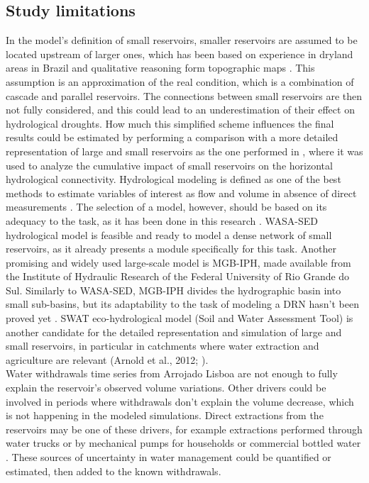 \documentclass[draft]{agujournal2019}
\begin{document}
\subsection{Study limitations}\label{sec:studylim}
In the model’s definition of small reservoirs, smaller reservoirs are assumed to be located upstream of larger ones, which has been based on experience in dryland areas in Brazil and qualitative reasoning form topographic maps \cite{Mamede2018,Guntner2004}. This assumption is an approximation of the real condition, which is a combination of cascade and parallel reservoirs. The connections between small reservoirs are then not fully considered, and this could lead to an underestimation of their effect on hydrological droughts. How much this simplified scheme influences the final results could be estimated by performing a comparison with a more detailed representation of large and small reservoirs as the one performed in , where it was used to analyze the cumulative impact of small reservoirs on the horizontal hydrological connectivity. Hydrological modeling is defined as one of the best methods to estimate variables of interest as flow and volume in absence of direct measurements \cite{Marahatta2021}. The selection of a model, however, should be based on its adequacy to the task, as it has been done in this research \cite{Addor2019}. WASA-SED hydrological model is feasible and ready to model a dense network of small reservoirs, as it already presents a module specifically for this task. Another promising and widely used large-scale model is MGB-IPH, made available from the Institute of Hydraulic Research of the Federal University of Rio Grande do Sul. Similarly to WASA-SED, MGB-IPH divides the hydrographic basin into small sub-basins, but its adaptability to the task of modeling a DRN hasn’t been proved yet \cite{Collischonn2007,DePaiva2013}. SWAT eco-hydrological model (Soil and Water Assessment Tool) is another candidate for the detailed representation and simulation of large and small reservoirs, in particular in catchments where water extraction and agriculture are relevant (Arnold et al., 2012; \cite{Rabelo2021}).\\
Water withdrawals time series from Arrojado Lisboa are not enough to fully explain the reservoir’s observed volume variations. Other drivers could be involved in periods where withdrawals don’t explain the volume decrease, which is not happening in the modeled simulations. Direct extractions from the reservoirs may be one of these drivers, for example extractions performed through water trucks or by mechanical pumps for households or commercial bottled water \cite{DeLiraAzevedo2017}. These sources of uncertainty in water management could be quantified or estimated, then added to the known withdrawals.\\
\end{document}

